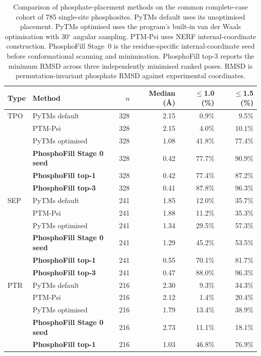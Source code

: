 \begin{table}[h!]
\caption{Comparison of phosphate-placement methods on the common complete-case cohort of 785 single-site phosphosites. PyTMs default uses its unoptimised placement. PyTMs optimised uses the program's built-in van der Waals optimisation with 30$^{\circ}$ angular sampling. PTM-Psi uses NERF internal-coordinate construction. PhosphoFill Stage~0 is the residue-specific internal-coordinate seed before conformational scanning and minimisation. PhosphoFill top-3 reports the minimum RMSD across three independently minimised ranked poses. RMSD is permutation-invariant phosphate RMSD against experimental coordinates.}
\label{tab:toolcomp}
\centering
\small
\begin{tabular}{llrrrr}
\toprule
\textbf{Type} & \textbf{Method} & \textbf{$n$} & \textbf{Median (\AA)} & \textbf{$\leq$1.0 (\%)} & \textbf{$\leq$1.5 (\%)} \\
\midrule
TPO & PyTMs default & 328 & 2.15 & 0.9\% & 9.5\% \\
 & PTM-Psi & 328 & 2.15 & 4.0\% & 10.1\% \\
 & PyTMs optimised & 328 & 1.08 & 41.8\% & 77.4\% \\
 & \textbf{PhosphoFill Stage 0 seed} & 328 & 0.42 & 77.7\% & 90.9\% \\
 & \textbf{PhosphoFill top-1} & 328 & 0.42 & 77.4\% & 87.2\% \\
 & \textbf{PhosphoFill top-3} & 328 & 0.41 & 87.8\% & 96.3\% \\
\addlinespace
SEP & PyTMs default & 241 & 1.85 & 12.0\% & 35.7\% \\
 & PTM-Psi & 241 & 1.88 & 11.2\% & 35.3\% \\
 & PyTMs optimised & 241 & 1.34 & 29.5\% & 57.3\% \\
 & \textbf{PhosphoFill Stage 0 seed} & 241 & 1.29 & 45.2\% & 53.5\% \\
 & \textbf{PhosphoFill top-1} & 241 & 0.55 & 70.1\% & 81.7\% \\
 & \textbf{PhosphoFill top-3} & 241 & 0.47 & 88.0\% & 96.3\% \\
\addlinespace
PTR & PyTMs default & 216 & 2.30 & 9.3\% & 34.3\% \\
 & PTM-Psi & 216 & 2.12 & 1.4\% & 20.4\% \\
 & PyTMs optimised & 216 & 1.79 & 13.4\% & 38.9\% \\
 & \textbf{PhosphoFill Stage 0 seed} & 216 & 2.73 & 11.1\% & 18.1\% \\
 & \textbf{PhosphoFill top-1} & 216 & 1.03 & 46.8\% & 76.9\% \\

\end{tabular}
\end{table}
